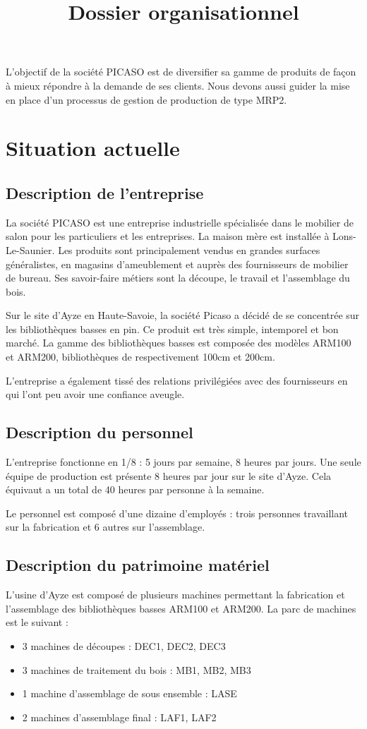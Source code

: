 \documentclass[a4paper]{TPInsa}
\title{Dossier organisationnel}
\begin{document}
	\pageTitre
	\tableMatieres

		L'objectif de la société PICASO est de diversifier sa gamme de produits de façon à mieux répondre à la demande de ses clients. Nous devons aussi guider la mise en place d'un processus de gestion de production de type MRP2.	
	
	\section{Situation actuelle}
	
	\subsection{Description de l'entreprise}
	
	La société PICASO est une entreprise industrielle spécialisée dans le mobilier de salon pour les particuliers et les entreprises. La maison mère est installée à Lons-Le-Saunier. Les produits sont principalement vendus en grandes surfaces généralistes, en magasins d'ameublement et auprès des fournisseurs de mobilier de bureau. Ses savoir-faire métiers sont la découpe, le travail et l'assemblage du bois.
	
	Sur le site d'Ayze en Haute-Savoie, la société Picaso a décidé de se concentrée sur les bibliothèques basses en pin. Ce produit est très simple, intemporel et bon marché. La gamme des bibliothèques basses est composée des modèles ARM100 et ARM200, bibliothèques de respectivement 100cm et 200cm.  
	
	
	L'entreprise a également tissé des relations privilégiées avec des fournisseurs en qui l'ont peu avoir une confiance aveugle. 
	
	\subsection{Description du personnel}
	L'entreprise fonctionne en 1/8 : 5 jours par semaine, 8 heures par jours. Une seule équipe de production est présente 8 heures par jour sur le site d'Ayze. Cela équivaut a un total de 40 heures par personne à la semaine. 
	
	Le personnel est composé d'une dizaine d'employés : trois personnes travaillant sur la fabrication et 6 autres sur l'assemblage. 
	\subsection{Description du patrimoine matériel}
	L'usine d'Ayze est composé de plusieurs machines permettant la fabrication et l'assemblage des bibliothèques basses ARM100 et ARM200. 
	La parc de machines est le suivant :
	\begin{itemize}
	\item 3 machines de découpes : DEC1, DEC2, DEC3
	\item 3 machines de traitement du bois : MB1, MB2, MB3
	\item 1 machine d'assemblage de sous ensemble : LASE
	\item 2 machines d'assemblage final : LAF1, LAF2
	\end{itemize}
	
\end{document}
